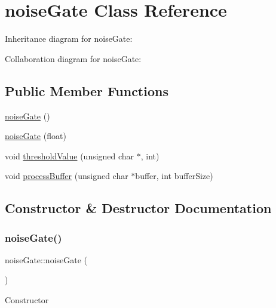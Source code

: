 \hypertarget{classnoiseGate}{}\section{noise\+Gate Class Reference}
\label{classnoiseGate}


Inheritance diagram for noise\+Gate\+:


Collaboration diagram for noise\+Gate\+:
\subsection*{Public Member Functions}
\begin{DoxyCompactItemize}
\item 
\hyperlink{classnoiseGate_ad51202e67e851f04029a0d78e10ae8d8}{noise\+Gate} ()
\item 
\hyperlink{classnoiseGate_ac4db3916ae2c89dea6e14f0bce446170}{noise\+Gate} (float)
\item 
void \hyperlink{classnoiseGate_a2d58154fafa037e4c9512284e0431eed}{threshold\+Value} (unsigned char $\ast$, int)
\item 
void \hyperlink{classnoiseGate_a80aba98941fd95442fa3961b370fad35}{process\+Buffer} (unsigned char $\ast$buffer, int buffer\+Size)
\end{DoxyCompactItemize}


\subsection{Constructor \& Destructor Documentation}
\mbox{\label{classnoiseGate_ad51202e67e851f04029a0d78e10ae8d8}} 
\subsubsection{\texorpdfstring{noise\+Gate()}{noiseGate()}\hspace{0.1cm}{\footnotesize\ttfamily [1/2]}}
{\footnotesize\ttfamily noise\+Gate\+::noise\+Gate (\begin{DoxyParamCaption}{ }\end{DoxyParamCaption})}

Constructor \mbox{\label{classnoiseGate_ac4db3916ae2c89dea6e14f0bce446170}} 
